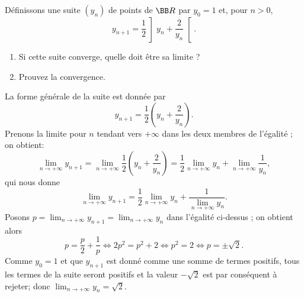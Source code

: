 \documentclass[12pt,french,oneside,a4paper]{memoir} %
\begin{document}
\begin{exo}
  Définissons une suite $(y_n)$ de points de ${\BB R}$ par $y_0=1$ et, 
  pour $n > 0$, 
  \begin{equation*}
    y_{n+1}=\frac{1}{2}\left]y_n+ \frac{2}{y_n}\right[.
  \end{equation*}
  \begin{enumerate}
  \item Si cette suite converge, quelle doit être sa limite ?
  \item Prouvez la convergence.
  \end{enumerate}
  \begin{correction}%
    La forme générale de la suite est donnée par
    \begin{equation*}\label{eqn:suite}
      y_{n+1}=\frac{1}{2}\left(y_n+\frac{2}{y_n}\right).
    \end{equation*}
    Prenons la limite pour $n$ tendant vers $+\infty$ dans les deux membres de l'égalité ; on obtient:
    \begin{equation*}
      \lim_{n\rightarrow+\infty}y_{n+1}=\lim_{n\rightarrow+\infty}\frac{1}{2}\left(y_n+\frac{2}{y_n}\right)=\frac{1}{2}\lim_{n\rightarrow+\infty}y_n+\lim_{n\rightarrow+\infty}\frac{1}{y_n},
    \end{equation*}
    qui nous donne
    \begin{equation*}
      \lim_{n\rightarrow+\infty}y_{n+1}=\frac{1}{2}\lim_{n\rightarrow+\infty}y_n+\frac{1}{\lim_{n\rightarrow+\infty}y_n}.
    \end{equation*}
    Posons $p=\lim_{n\rightarrow+\infty}y_{n+1}=\lim_{n\rightarrow+\infty}y_n$ dans l'égalité ci-dessus ; on obtient alors
    \begin{equation*}
      p=\frac{p}{2}+\frac{1}{p}\Leftrightarrow 2p^2=p^2+2\Leftrightarrow p^2=2\Leftrightarrow p=\pm\sqrt{2}.
    \end{equation*}
    Comme $y_0=1$ et que $y_{n+1}$ est donné comme une somme de termes positifs, tous les termes de la suite seront positifs et la valeur $-\sqrt{2}$ est par conséquent à rejeter; donc $\lim_{n\rightarrow+\infty}y_n=\sqrt{2}$.

\end{correction}
\end{exo}
\end{document}
